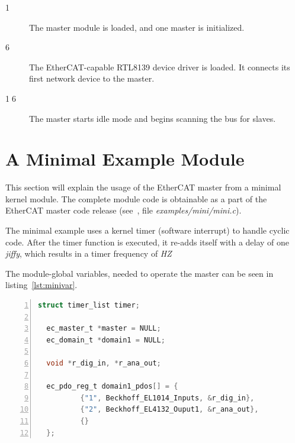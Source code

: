 \documentclass[a4paper,12pt,BCOR6mm,bibtotoc,idxtotoc]{scrbook}
\begin{document}
\begin{description}
\item[\normalfont\textcircled{\tiny 1}] The master module is loaded,
  and one master is initialized.
\item[\normalfont\textcircled{\tiny 6}] The EtherCAT-capable RTL8139
  device driver is loaded. It connects its first network device to the
  master.
\item[\normalfont\textcircled{\tiny 16}] The master starts idle mode
  and begins scanning the bus for slaves.
\end{description}


\section{A Minimal Example Module}
\label{sec:mini}

This section will explain the usage of the EtherCAT master from a
minimal kernel module. The complete module code is obtainable as a
part of the EtherCAT master code release (see~\cite{etherlab}, file
\textit{examples/mini/mini.c}).

The minimal example uses a kernel timer (software interrupt) to handle
cyclic code. After the timer function is executed, it re-adds itself
with a delay of one \textit{jiffy}, which results in a
timer frequency of \textit{HZ}

The module-global variables, needed to operate the master can be seen
in listing~\ref{lst:minivar}.

\begin{lstlisting}[language=C,numbers=left,caption={Minimal
    variables},label=lst:minivar]
  struct timer_list timer;

  ec_master_t *master = NULL;
  ec_domain_t *domain1 = NULL;

  void *r_dig_in, *r_ana_out;

  ec_pdo_reg_t domain1_pdos[] = {
          {"1", Beckhoff_EL1014_Inputs, &r_dig_in},
          {"2", Beckhoff_EL4132_Ouput1, &r_ana_out},
          {}
  };
\end{lstlisting}
\end{document}
